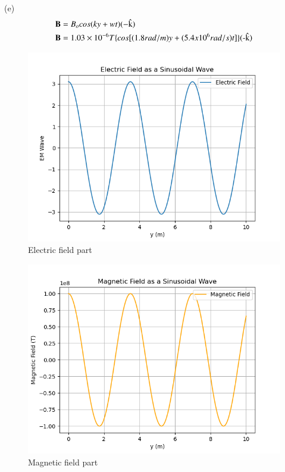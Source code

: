 \documentclass[journal,12pt,twocolumn]{IEEEtran}
\theoremstyle{remark}
\begin{document}
(e)
\begin{align}
	\textbf{B}&=B_ocos(ky+wt)(-\text{\^k}) \\
	\notag \textbf{B}&=1.03\times10^{-6}T\{cos[(1.8rad/m)y+(5.4x10^{6}rad/s)t]\}(\text{-\^k})
\end{align}
\newpage
\begin{figure}[h]
\centering
\includegraphics[width=1\columnwidth]{Ewave.png}
\caption{Electric field part}
\label{solution}
\end{figure}



\begin{figure}[h]
\centering
\includegraphics[width=1\columnwidth]{Mwave.png}
\caption{Magnetic field part}
\label{solution}
\end{figure}
\end{document}

